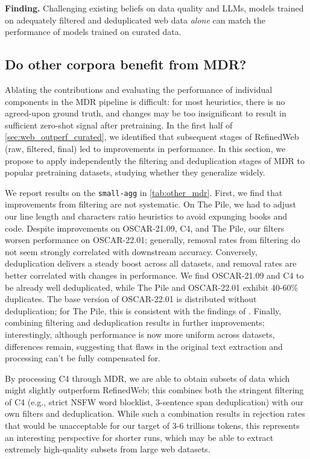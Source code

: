 \vfill

\begin{mdframed}
\textbf{Finding.} Challenging existing beliefs on data quality and LLMs, models trained on adequately filtered and deduplicated web data \emph{alone} can match the performance of models trained on curated data.
\end{mdframed}

\vfill

\subsection{Do other corpora benefit from MDR?}
\label{sec:dedup_curated}

Ablating the contributions and evaluating the performance of individual components in the MDR pipeline is difficult: for most heuristics, there is no agreed-upon ground truth, and changes may be too insignificant to result in sufficient zero-shot signal after pretraining. In the first half of \ref{sec:web_outperf_curated}, we identified that subsequent stages of RefinedWeb (raw, filtered, final) led to improvements in performance. In this section, we propose to apply independently the filtering and deduplication stages of MDR to popular pretraining datasets, studying whether they generalize widely.

We report results on the \texttt{small-agg} in \ref{tab:other_mdr}. First, we find that improvements from filtering are not systematic. On The Pile, we had to adjust our line length and characters ratio heuristics to avoid expunging books and code. Despite improvements on OSCAR-21.09, C4, and The Pile, our filters worsen performance on OSCAR-22.01; generally, removal rates from filtering do not seem strongly correlated with downstream accuracy. Conversely, deduplication delivers a steady boost across all datasets, and removal rates are better correlated with changes in performance. We find OSCAR-21.09 and C4 to be already well deduplicated, while The Pile and OSCAR-22.01 exhibit 40-60\% duplicates. The base version of OSCAR-22.01 is distributed without deduplication; for The Pile, this is consistent with the findings of \citet{zhang2022opt}. Finally, combining filtering and deduplication results in further improvements; interestingly, although performance is now more uniform across datasets, differences remain, suggesting that flaws in the original text extraction and processing can't be fully compensated for. 

By processing C4 through MDR, we are able to obtain subsets of data which might slightly outperform RefinedWeb; this combines both the stringent filtering of C4 (e.g., strict NSFW word blocklist, 3-sentence span deduplication) with our own filters and deduplication. While such a combination results in rejection rates that would be unacceptable for our target of 3-6 trillions tokens, this represents an interesting perspective for shorter runs, which may be able to extract extremely high-quality subsets from large web datasets.

